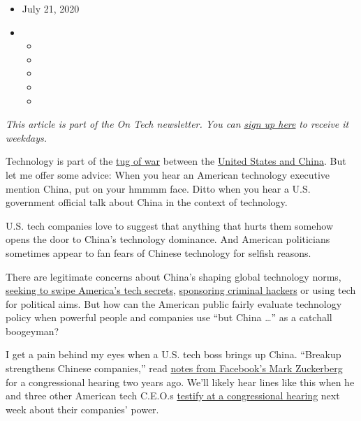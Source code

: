 \begin{itemize}
\item
  July 21, 2020
\item
  \begin{itemize}
  \item
  \item
  \item
  \item
  \item
  \end{itemize}
\end{itemize}

\emph{This article is part of the On Tech newsletter. You can}
\href{https://www.nytimes3xbfgragh.onion/newsletters/signup/OT}{\emph{sign
up here}} \emph{to receive it weekdays.}

Technology is part of the
\href{https://www.nytimes3xbfgragh.onion/2020/07/14/world/asia/cold-war-china-us.html}{tug
of war} between the
\href{https://www.nytimes3xbfgragh.onion/2020/07/22/world/asia/us-china-houston-consulate.html}{United
States and China}. But let me offer some advice: When you hear an
American technology executive mention China, put on your hmmmm face.
Ditto when you hear a U.S. government official talk about China in the
context of technology.

U.S. tech companies love to suggest that anything that hurts them
somehow opens the door to China's technology dominance. And American
politicians sometimes appear to fan fears of Chinese technology for
selfish reasons.

There are legitimate concerns about China's shaping global technology
norms,
\href{https://www.nytimes3xbfgragh.onion/2020/01/15/business/china-technology-transfer.html}{seeking
to swipe America's tech secrets},
\href{https://www.washingtonpost.com/national-security/us-china-covid-19-vaccine-research/2020/07/21/8b6ca0c0-cb58-11ea-91f1-28aca4d833a0_story.html}{sponsoring
criminal hackers} or using tech for political aims. But how can the
American public fairly evaluate technology policy when powerful people
and companies use ``but China \ldots'' as a catchall boogeyman?

I get a pain behind my eyes when a U.S. tech boss brings up China.
``Breakup strengthens Chinese companies,'' read
\href{https://www.nytimes3xbfgragh.onion/2018/04/11/us/mark-zuckerberg-senate-hearing-notes.html}{notes
from Facebook's Mark Zuckerberg} for a congressional hearing two years
ago. We'll likely hear lines like this when he and three other American
tech C.E.O.s
\href{https://www.nytimes3xbfgragh.onion/2020/07/01/technology/amazon-apple-alphabet-facebook-congress-antitrust.html}{testify
at a congressional hearing} next week about their companies' power.

